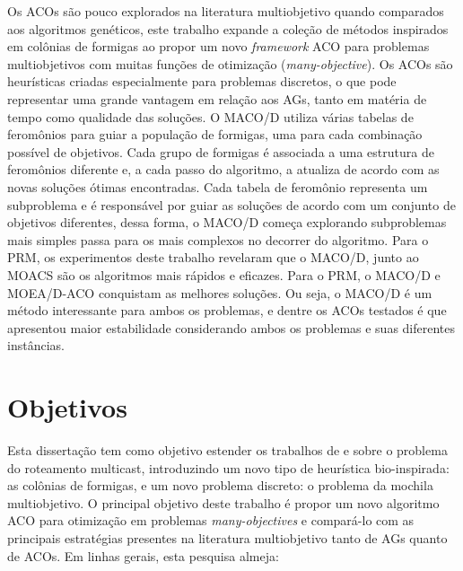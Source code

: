 Os \acp{ACO} são pouco explorados na literatura multiobjetivo quando comparados aos algoritmos genéticos, este trabalho expande a coleção de métodos inspirados em colônias de formigas ao propor um novo \textit{framework} ACO para problemas multiobjetivos com muitas funções de otimização (\textit{many-objective}). Os ACOs são heurísticas criadas especialmente para problemas discretos, o que pode representar uma grande vantagem em relação aos AGs, tanto em matéria de tempo como qualidade das soluções. O MACO/D utiliza várias tabelas de feromônios para guiar a população de formigas, uma para cada combinação possível de objetivos. Cada grupo de formigas é associada a uma estrutura de feromônios diferente e, a cada passo do algoritmo, a atualiza de acordo com as novas soluções ótimas encontradas. Cada tabela de feromônio representa um subproblema e é responsável por guiar as soluções de acordo com um conjunto de objetivos diferentes, dessa forma, o MACO/D começa explorando subproblemas mais simples passa para os mais complexos no decorrer do algoritmo. Para o PRM, os experimentos deste trabalho revelaram que o MACO/D, junto ao MOACS são os algoritmos mais rápidos e eficazes. Para o PRM, o MACO/D e MOEA/D-ACO conquistam as melhores soluções. Ou seja, o MACO/D é um método interessante para ambos os problemas, e dentre os ACOs testados é que apresentou maior estabilidade considerando ambos os problemas e suas diferentes instâncias.

\section{Objetivos}
Esta dissertação tem como objetivo estender os trabalhos de \cite{Lafeta2016} e \cite{Bueno2010} sobre o problema do roteamento multicast, introduzindo um novo tipo de heurística bio-inspirada: as colônias de formigas, e um novo problema discreto: o problema da mochila multiobjetivo. O principal objetivo deste trabalho é propor um novo algoritmo ACO para otimização em problemas \textit{many-objectives} e compará-lo com as principais estratégias presentes na literatura multiobjetivo tanto de AGs quanto de ACOs. Em linhas gerais, esta pesquisa almeja:
 
